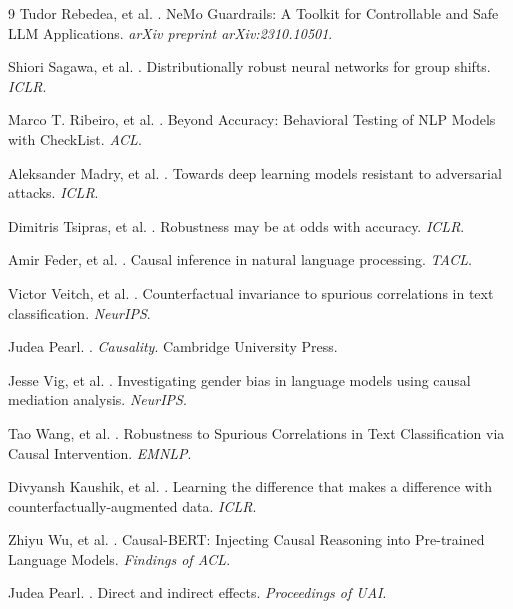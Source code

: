\documentclass{acmart}
\begin{document}
\begin{thebibliography}{9}
Tudor Rebedea, et al.
.
\newblock NeMo Guardrails: A Toolkit for Controllable and Safe LLM Applications.
\newblock \emph{arXiv preprint arXiv:2310.10501}.

Shiori Sagawa, et al.
.
\newblock Distributionally robust neural networks for group shifts.
\newblock \emph{ICLR}.

Marco T. Ribeiro, et al.
.
\newblock Beyond Accuracy: Behavioral Testing of NLP Models with CheckList.
\newblock \emph{ACL}.

Aleksander Madry, et al.
.
\newblock Towards deep learning models resistant to adversarial attacks.
\newblock \emph{ICLR}.

Dimitris Tsipras, et al.
.
\newblock Robustness may be at odds with accuracy.
\newblock \emph{ICLR}.

Amir Feder, et al.
.
\newblock Causal inference in natural language processing.
\newblock \emph{TACL}.

Victor Veitch, et al.
.
\newblock Counterfactual invariance to spurious correlations in text classification.
\newblock \emph{NeurIPS}.

Judea Pearl.
.
\newblock \emph{Causality}.
\newblock Cambridge University Press.

Jesse Vig, et al.
.
\newblock Investigating gender bias in language models using causal mediation analysis.
\newblock \emph{NeurIPS}.

Tao Wang, et al.
.
\newblock Robustness to Spurious Correlations in Text Classification via Causal Intervention.
\newblock \emph{EMNLP}.

Divyansh Kaushik, et al.
.
\newblock Learning the difference that makes a difference with counterfactually-augmented data.
\newblock \emph{ICLR}.

Zhiyu Wu, et al.
.
\newblock Causal-BERT: Injecting Causal Reasoning into Pre-trained Language Models.
\newblock \emph{Findings of ACL}.

Judea Pearl.
.
\newblock Direct and indirect effects.
\newblock \emph{Proceedings of UAI}.


\end{thebibliography}
\end{document}
